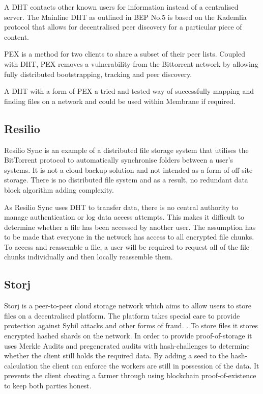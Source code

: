 \documentclass[11pt, a4paper, twocolumn, twoside]{report}
\begin{document}
A DHT contacts other known users for information instead of a centralised server. The Mainline DHT as outlined in BEP No.5 is based on the Kademlia protocol that allows for decentralised peer discovery for a particular piece of content.

PEX is a method for two clients to share a subset of their peer lists. Coupled with DHT, PEX removes a vulnerability from the Bittorrent network by allowing fully distributed bootstrapping, tracking and peer discovery.

A DHT with a form of PEX a tried and tested way of successfully mapping and finding files on a network and could be used within Membrane if required.

\subsection{Resilio}

Resilio Sync is an example of a distributed file storage system that utilises the BitTorrent protocol to automatically synchronise folders between a user’s systems. It is not a cloud backup solution and not intended as a form of off-site storage. There is no distributed file system and as a result, no redundant data block algorithm adding complexity. \citep{farina2014bittorrent}

As Resilio Sync uses DHT to transfer data, there is no central authority to manage authentication or log data access attempts. This makes it difficult to determine whether a file has been accessed by another user. \citep{farina2014bittorrent} The assumption has to be made that everyone in the network has access to all encrypted file chunks. To access and reassemble a file, a user will be required to request all of the file chunks individually and then locally reassemble them.

\subsection{Storj}

Storj is a peer-to-peer cloud storage network which aims to allow users to store files on a decentralised platform. The platform takes special care to provide protection against Sybil attacks and other forms of fraud. \citep{Wilkinson14storja}. To store files it stores encrypted hashed shards on the network. In order to provide proof-of-storage it uses Merkle Audits and pregenerated audits with hash-challenges to determine whether the client still holds the required data. By adding a seed to the hash-calculation the client can enforce the workers are still in possession of the data. It prevents the client cheating a farmer through using blockchain proof-of-existence to keep both parties honest.
\end{document}
